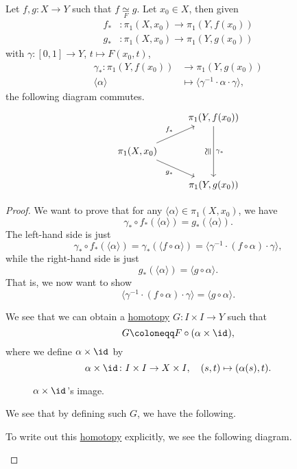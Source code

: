 \begin{lemma}
	Let \(f, g\colon X\to Y\) such that \(f \underset{F}{\simeq }g \). Let \(x_0\in X\), then given
	\[
		\begin{split}
			f_\ast & \colon \pi _1(X, x_0)\to \pi _1(Y, f(x_0)) \\
			g_\ast & \colon \pi _1(X, x_0)\to \pi _1(Y, g(x_0))
		\end{split}
	\]
	with \(\gamma \colon [0, 1]\to Y\), \(t\mapsto F(x_0, t)\),
	\[
		\begin{split}
			\gamma _\ast \colon \pi _1(Y, f(x_0)) & \to \pi _1(Y, g(x_0))                                            \\
			\langle \alpha  \rangle               & \mapsto \langle \gamma ^{-1} \cdot \alpha \cdot \gamma  \rangle,
		\end{split}
	\]
	the following diagram commutes.
	\[
		\begin{tikzcd}
			& {\pi_1(Y, f(x_0))} \\
			{\pi_1(X, x_0)} \\
			& {\pi_1(Y, g(x_0))}
			\arrow["{\gamma_\ast}", from=1-2, to=3-2]
			\arrow["\cong"{marking}, shift left=2, draw=none, from=3-2, to=1-2]
			\arrow["{f_\ast}", from=2-1, to=1-2]
			\arrow["g_\ast"', from=2-1, to=3-2]
		\end{tikzcd}
	\]
\end{lemma}
\begin{proof}
	We want to prove that for any \(\langle \alpha  \rangle \in \pi _1(X, x_0)\), we have
	\[
		\gamma _\ast \circ f_\ast(\langle \alpha  \rangle ) = g_\ast (\langle \alpha  \rangle ).
	\]
	The left-hand side is just
	\[
		\gamma _\ast \circ f_\ast (\langle \alpha  \rangle )= \gamma _\ast \left(\langle f\circ \alpha  \rangle \right) = \langle \gamma ^{-1} \cdot \left(f\circ \alpha \right)\cdot \gamma  \rangle,
	\]
	while the right-hand side is just
	\[
		g_\ast (\langle \alpha  \rangle )= \langle g\circ \alpha  \rangle.
	\]
	That is, we now want to show
	\[
		\langle \gamma ^{-1} \cdot (f\circ \alpha ) \cdot \gamma \rangle = \langle g\circ \alpha  \rangle.
	\]

	\begin{center}
	\end{center}
	We see that we can obtain a \hyperref[def:homotopy]{homotopy} \(G\colon I\times I\to Y\) such that
	\[
		G\coloneqq F\circ (\alpha \times \id_{}),
	\]
	where we define \(\alpha \times \id_{} \) by
	\[
		\alpha \times \id_{} \colon I\times I\to X\times I,\quad (s, t)\mapsto (\alpha (s), t).
	\]
	\begin{figure}[H]
		\centering
		\caption{\(\alpha\times\id_{} \)'s image.}
		\label{fig:pf:lma:lec9-2}
	\end{figure}
	We see that by defining such \(G\), we have the following.
	\begin{center}
	\end{center}
	To write out this \hyperref[def:homotopy]{homotopy} explicitly, we see the following diagram.
	\begin{center}
	\end{center}
\end{proof}

